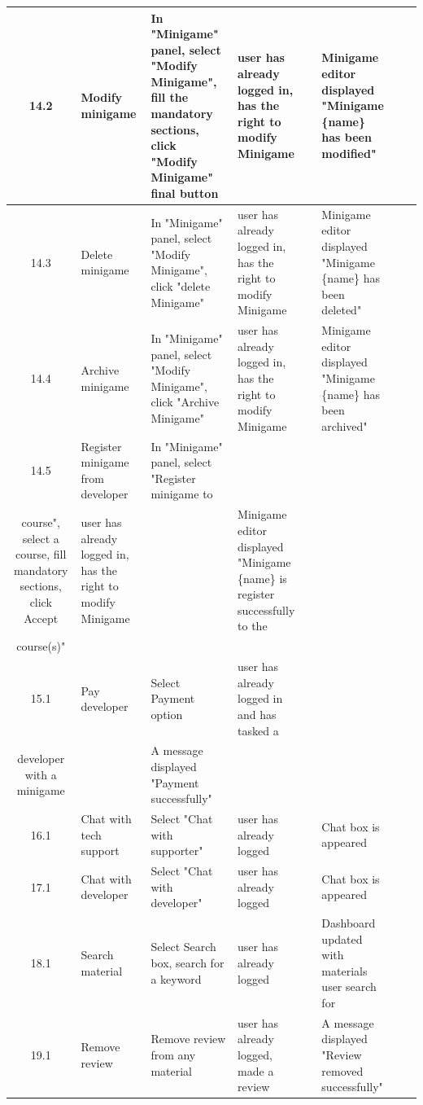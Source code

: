 \begin{longtable}{|c|m{1.5cm}|m{2.5cm}|m{2.5cm}|m{1.5cm}|m{2.5cm}|m{1.5cm}|m{1.5cm}|}
	14.2 & Modify minigame & In "Minigame" panel, select "Modify Minigame", fill the mandatory sections, click "Modify Minigame" final button & user has already logged in, has the right to modify Minigame &  & Minigame editor displayed "Minigame \{name\} has been modified" &  &  \\ \hline
	14.3 & Delete minigame & In "Minigame" panel, select "Modify Minigame", click "delete Minigame" & user has already logged in, has the right to modify Minigame &  & Minigame editor displayed "Minigame \{name\} has been deleted" &  &  \\ \hline
	14.4 & Archive minigame & In "Minigame" panel, select "Modify Minigame", click "Archive Minigame" & user has already logged in, has the right to modify Minigame &  & Minigame editor displayed "Minigame \{name\} has been archived" &  &  \\ \hline
	14.5 & Register minigame from developer & In "Minigame" panel, select "Register minigame to\\ course", select a course, fill mandatory sections, click Accept & user has already logged in, has the right to modify Minigame &  & Minigame editor displayed "Minigame \{name\} is register successfully to the\\ course(s)" &  &  \\ \hline
	15.1 & Pay developer & Select Payment option & user has already logged in and has tasked a\\ developer with a minigame &  & A message displayed "Payment successfully" &  &  \\ \hline
	16.1 & Chat with tech support & Select "Chat with supporter" & \cellcolor[HTML]{FFFFFF}user has already logged &  & Chat box is appeared &  &  \\ \hline
	17.1 & Chat with developer & Select "Chat with developer" & \cellcolor[HTML]{FFFFFF}user has already logged &  & Chat box is appeared &  &  \\ \hline
	18.1 & Search material & Select Search box, search for a keyword & \cellcolor[HTML]{FFFFFF}user has already logged &  & Dashboard updated with materials user search for &  &  \\ \hline
	19.1 & Remove review & Remove review from any material & \cellcolor[HTML]{FFFFFF}user has already logged, made a review &  & A message displayed "Review removed successfully" &  &  \\ \hline
	\end{longtable}
		